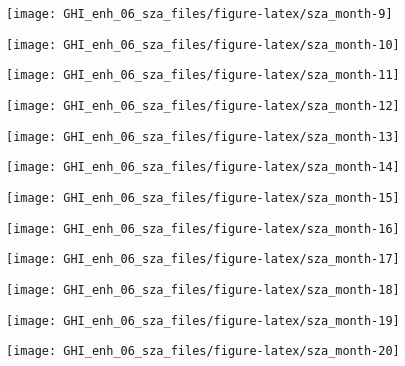 \documentclass[
  10pt,
  a4paper,oneside]{article}
\begin{document}
\begin{center}\texttt{[image: GHI\_enh\_06\_sza\_files/figure-latex/sza\_month-9]} \end{center}

\begin{center}\texttt{[image: GHI\_enh\_06\_sza\_files/figure-latex/sza\_month-10]} \end{center}

\begin{center}\texttt{[image: GHI\_enh\_06\_sza\_files/figure-latex/sza\_month-11]} \end{center}

\begin{center}\texttt{[image: GHI\_enh\_06\_sza\_files/figure-latex/sza\_month-12]} \end{center}

\begin{center}\texttt{[image: GHI\_enh\_06\_sza\_files/figure-latex/sza\_month-13]} \end{center}

\begin{center}\texttt{[image: GHI\_enh\_06\_sza\_files/figure-latex/sza\_month-14]} \end{center}

\begin{center}\texttt{[image: GHI\_enh\_06\_sza\_files/figure-latex/sza\_month-15]} \end{center}

\begin{center}\texttt{[image: GHI\_enh\_06\_sza\_files/figure-latex/sza\_month-16]} \end{center}

\begin{center}\texttt{[image: GHI\_enh\_06\_sza\_files/figure-latex/sza\_month-17]} \end{center}

\begin{center}\texttt{[image: GHI\_enh\_06\_sza\_files/figure-latex/sza\_month-18]} \end{center}

\begin{center}\texttt{[image: GHI\_enh\_06\_sza\_files/figure-latex/sza\_month-19]} \end{center}

\begin{center}\texttt{[image: GHI\_enh\_06\_sza\_files/figure-latex/sza\_month-20]} \end{center}
\end{document}
